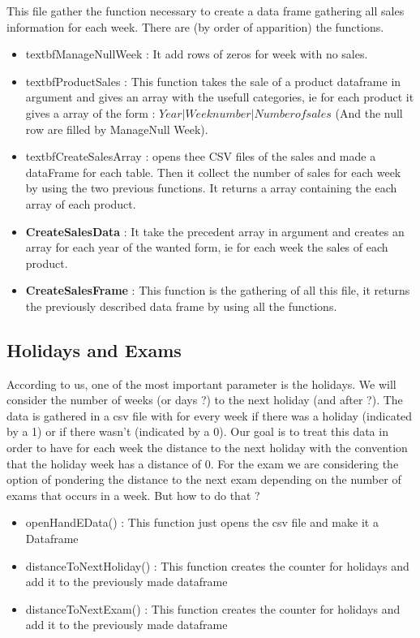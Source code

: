\documentclass{report}
\begin{document}
This file gather the function necessary to create a data frame gathering all sales information for each week. There are (by order of apparition) the functions.

\begin{itemize}
\item textbf{ManageNullWeek} : It add rows of zeros for week with no sales.
\item textbf{ProductSales} : This function takes the sale of a product dataframe in argument and gives an array with the usefull categories, ie for each product it gives a array of the form : $Year | Week number  | Number of sales$ (And the null row are filled by ManageNull Week).
\item textbf{CreateSalesArray} : opens thee CSV files of the sales and made a dataFrame for each table. Then it collect the number of sales for each week by using the two previous functions. It returns a array containing the each array of each product.
\item \textbf{CreateSalesData} : It take the precedent array in argument and creates an array for each year of the wanted form, ie for each week the sales of each product.
\item \textbf{CreateSalesFrame} : This function is the gathering of all this file, it returns the previously described data frame by using all the functions.
\end{itemize}

\subsection{Holidays and Exams}

According to us, one of the most important parameter is the holidays. We will consider the number of weeks (or days ?) to the next holiday (and after ?). The data is gathered in a csv file with for every week if there was a holiday (indicated by a 1) or if there wasn't (indicated by a 0). Our goal is to treat this data in order to have for each week the distance to the next holiday with the convention that the holiday week has a distance of 0. 
For the exam we are considering the option of pondering the distance to the next exam depending on the number of exams that occurs in a week. But how to do that ?

\begin{itemize}
\item openHandEData() : This function just opens the csv file and make it a Dataframe
\item distanceToNextHoliday() : This function creates the counter for holidays and add it to the previously made dataframe
\item distanceToNextExam() : This function creates the counter for holidays and add it to the previously made dataframe
\end{itemize}
\end{document}
